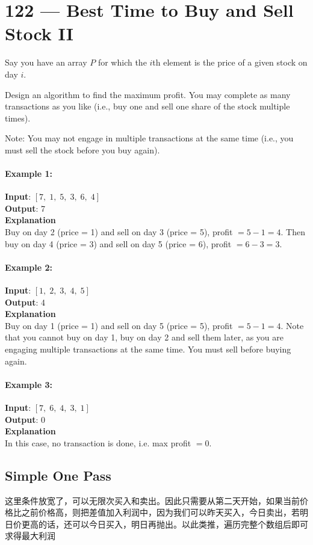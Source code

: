 \section{122 --- Best Time to Buy and Sell Stock II}
Say you have an array $P$ for which the $i$th element is the price of a given stock on day $i$.

Design an algorithm to find the maximum profit. You may complete as many transactions as you like (i.e., buy one and sell one share of the stock multiple times).

Note: You may not engage in multiple transactions at the same time (i.e., you must sell the stock before you buy again).
\paragraph{Example 1:}
\begin{flushleft}
\textbf{Input}: $[7,\;1,\;5,\;3,\;6,\;4]$
\\
\textbf{Output}: 7
\\
\textbf{Explanation}
\\
Buy on day 2 (price = 1) and sell on day 3 (price = 5), profit $= 5-1 = 4$. Then buy on day 4 (price = 3) and sell on day 5 (price = 6), profit $= 6-3 = 3$.
\end{flushleft}
\paragraph{Example 2:}
\begin{flushleft}
\textbf{Input}: $[1,\;2,\;3,\;4,\;5]$
\\
\textbf{Output}: 4
\\
\textbf{Explanation}
\\
Buy on day 1 (price = 1) and sell on day 5 (price = 5), profit $= 5-1 = 4$. Note that you cannot buy on day 1, buy on day 2 and sell them later, as you are engaging multiple transactions at the same time. You must sell before buying again.
\end{flushleft}
\paragraph{Example 3:}
\begin{flushleft}
\textbf{Input}: $[7,\;6,\;4,\;3,\;1]$
\\
\textbf{Output}: 0
\\
\textbf{Explanation}
\\
In this case, no transaction is done, i.e. max profit $= 0$.
\end{flushleft}
\subsection{Simple One Pass}
这里条件放宽了，可以无限次买入和卖出。因此只需要从第二天开始，如果当前价格比之前价格高，则把差值加入利润中，因为我们可以昨天买入，今日卖出，若明日价更高的话，还可以今日买入，明日再抛出。以此类推，遍历完整个数组后即可求得最大利润
